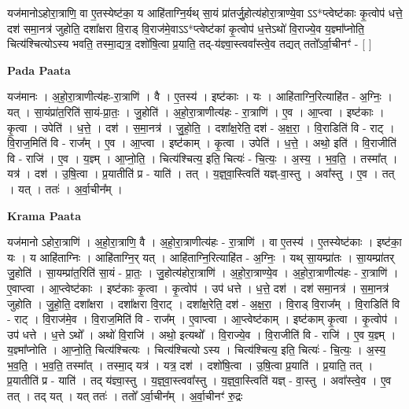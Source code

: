 \documentclass[17pt]{extarticle}
\begin{document}
यज॑मानोऽहोरा॒त्राणि॒ वा ए॒तस्येष्ट॑का॒ य आहि॑ताग्नि॒र्यथ् सा॒यं प्रा॑तर्जु॒होत्य॑होरा॒त्राण्ये॒वा ऽऽ*प्त्वेष्ट॑काः कृ॒त्वोप॑ धत्ते॒ दश॑ समा॒नत्र॑ जुहोति॒ दशा᳚क्षरा वि॒राड् वि॒राज॑मे॒वाऽऽ*प्त्वेष्ट॑कां कृ॒त्वोप॑ ध॒त्तेऽथो॑ वि॒राज्ये॒व य॒ज्ञ्मा᳚प्नोति॒ चित्य॑श्चित्योऽस्य भवति॒ तस्मा॒द्यत्र॒ दशो॑षि॒त्वा प्र॒याति॒ तद्-य॑ज्ञ्वा॒स्त्ववा᳚स्त्वे॒व तद्यत् ततो᳚ऽर्वा॒चीनꣳ॑ - [  ] \newline

\textbf{Pada Paata} \newline

यज॑मानः । अ॒हो॒रा॒त्राणीत्य॑हः-रा॒त्राणि॑ । वै । ए॒तस्य॑ । इष्ट॑काः । यः । आहि॑ताग्नि॒रित्याहि॑त - अ॒ग्निः॒ । यत् । सा॒यंप्रा॑त॒रिति॑ सा॒यं-प्रा॒तः॒ । जु॒होति॑ । अ॒हो॒रा॒त्राणीत्य॑हः - रा॒त्राणि॑ । ए॒व । आ॒प्त्वा । इष्ट॑काः । कृ॒त्वा । उपेति॑ । ध॒त्ते॒ । दश॑ । स॒मा॒नत्र॑ । जु॒हो॒ति॒ । दशा᳚क्ष॒रेति॒ दश॑ - अ॒क्ष॒रा॒ । वि॒राडिति॑ वि - राट् । वि॒राज॒मिति॑ वि - राज᳚म् । ए॒व । आ॒प्त्वा । इष्ट॑काम् । कृ॒त्वा । उपेति॑ । ध॒त्ते॒ । अथो॒ इति॑ । वि॒राजीति॑ वि - राजि॑ । ए॒व । य॒ज्ञ्म् । आ॒प्नो॒ति॒ । चित्य॑श्चित्य॒ इति॒ चित्यः॑ - चि॒त्यः॒ । अ॒स्य॒ । भ॒व॒ति॒ । तस्मा᳚त् । यत्र॑ । दश॑ । उ॒षि॒त्वा । प्र॒यातीति॑ प्र - याति॑ । तत् । य॒ज्ञ्॒वा॒स्त्विति॑ यज्ञ्-वा॒स्तु । अवा᳚स्तु । ए॒व । तत् । यत् । ततः॑ । अ॒र्वा॒चीन᳚म् ।  \newline


\textbf{Krama Paata} \newline

यज॑मानो ऽहोरा॒त्राणि॑ । अ॒हो॒रा॒त्राणि॒ वै । अ॒हो॒रा॒त्राणीत्य॑हः - रा॒त्राणि॑ । वा ए॒तस्य॑ । ए॒तस्येष्ट॑काः । इष्ट॑का॒ यः । य आहि॑ताग्निः । आहि॑ताग्नि॒र् यत् । आहि॑ताग्नि॒रित्याहि॑त - अ॒ग्निः॒ । यथ् सा॒यम्प्रा॑तः । सा॒यम्प्रा॑तर् जु॒होति॑ । सा॒यम्प्रा॑त॒रिति॑ सा॒यं - प्रा॒तः॒ । जु॒होत्य॑होरा॒त्राणि॑ । अ॒हो॒रा॒त्राण्ये॒व । अ॒हो॒रा॒त्राणीत्य॑हः - रा॒त्राणि॑ । ए॒वाप्त्वा । आ॒प्त्वेष्ट॑काः । इष्ट॑काः कृ॒त्वा । कृ॒त्वोप॑ । उप॑ धत्ते । ध॒त्ते॒ दश॑ । दश॑ समा॒नत्र॑ । स॒मा॒नत्र॑ जुहोति । जु॒हो॒ति॒ दशा᳚क्षरा । दशा᳚क्षरा वि॒राट् । दशा᳚क्ष॒रेति॒ दश॑ - अ॒क्ष॒रा॒ । वि॒राड् वि॒राज᳚म् । वि॒राडिति॑ वि - राट् । वि॒राज॑मे॒व । वि॒राज॒मिति॑ वि - राज᳚म् । ए॒वाप्त्वा । आ॒प्त्वेष्ट॑काम् । इष्ट॑काम् कृ॒त्वा । कृ॒त्वोप॑ । उप॑ धत्ते । ध॒त्ते ऽथो᳚ । अथो॑ वि॒राजि॑ । अथो॒ इत्यथो᳚ । वि॒राज्ये॒व । वि॒राजीति॑ वि - राजि॑ । ए॒व य॒ज्ञ्म् । य॒ज्ञ्मा᳚प्नोति । आ॒प्नो॒ति॒ चित्य॑श्चित्यः । चित्य॑श्चित्यो ऽस्य । चित्य॑श्चित्य॒ इति॒ चित्यः॑ - चि॒त्यः॒ । अ॒स्य॒ भ॒व॒ति॒ । भ॒व॒ति॒ तस्मा᳚त् । तस्मा॒द् यत्र॑ । यत्र॒ दश॑ । दशो॑षि॒त्वा । उ॒षि॒त्वा प्र॒याति॑ । प्र॒याति॒ तत् । प्र॒यातीति॑ प्र - याति॑ । तद् य॑ज्ञ्वा॒स्तु । य॒ज्ञ्॒वा॒स्त्ववा᳚स्तु । य॒ज्ञ्॒वा॒स्त्विति॑ यज्ञ् - वा॒स्तु । अवा᳚स्त्वे॒व । ए॒व तत् । तद् यत् । यत् ततः॑ । ततो᳚ ऽर्वा॒चीन᳚म् । अ॒र्वा॒चीनꣳ॑ रु॒द्रः \newline
\end{document}
